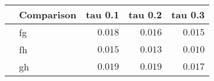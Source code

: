 \begin{table}[!tbp]
\begin{center}
\begin{tabular}{llrrr}
\hline\hline
\multicolumn{1}{l}{}&\multicolumn{1}{c}{Comparison}&\multicolumn{1}{c}{tau 0.1}&\multicolumn{1}{c}{tau 0.2}&\multicolumn{1}{c}{tau 0.3}\tabularnewline
\hline
&fg&$0.018$&$0.016$&$0.015$\tabularnewline
&fh&$0.015$&$0.013$&$0.010$\tabularnewline
&gh&$0.019$&$0.019$&$0.017$\tabularnewline
\hline
\end{tabular}\end{center}
\end{table}
